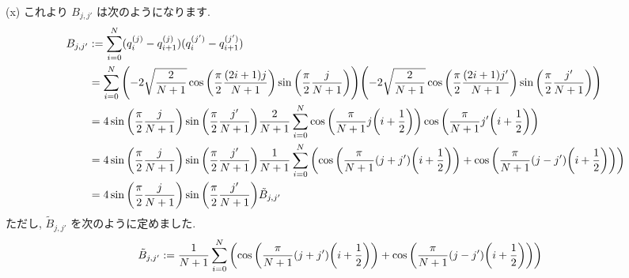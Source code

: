 \documentclass[a4paper,dvipdfmx]{jsarticle}
\theoremstyle{definition}
\begin{document}
(x) これより $B_{j,j'}$ は次のようになります.
\begin{align}
  B_{j,j'} & := \sum_{i=0}^{N}(q_i^{(j)} - q_{i+1}^{(j)})(q_i^{(j')} - q_{i+1}^{(j')})                                                                                                                                                              \\
           & = \sum_{i=0}^{N}\qty(-2\sqrt{\frac{2}{N+1}}\cos\qty(\frac{\pi}{2}\frac{(2i+1)j}{N+1})\sin\qty(\frac{\pi}{2}\frac{j}{N+1}))\qty(-2\sqrt{\frac{2}{N+1}}\cos\qty(\frac{\pi}{2}\frac{(2i+1)j'}{N+1})\sin\qty(\frac{\pi}{2}\frac{j'}{N+1})) \\
           & = 4\sin\qty(\frac{\pi}{2}\frac{j}{N+1})\sin\qty(\frac{\pi}{2}\frac{j'}{N+1})\frac{2}{N+1}\sum_{i=0}^{N}\cos\qty(\frac{\pi}{N+1}j\qty(i + \frac{1}{2}))\cos\qty(\frac{\pi}{N+1}j'\qty(i + \frac{1}{2}))                                 \\
           & = 4\sin\qty(\frac{\pi}{2}\frac{j}{N+1})\sin\qty(\frac{\pi}{2}\frac{j'}{N+1})\frac{1}{N+1}\sum_{i=0}^{N}\qty(\cos\qty(\frac{\pi}{N+1}(j + j')\qty(i + \frac{1}{2})) + \cos\qty(\frac{\pi}{N+1}(j - j')\qty(i + \frac{1}{2})))           \\
           & = 4\sin\qty(\frac{\pi}{2}\frac{j}{N+1})\sin\qty(\frac{\pi}{2}\frac{j'}{N+1})\tilde{B}_{j,j'}
\end{align}
ただし, $\tilde{B}_{j,j'}$ を次のように定めました.
\begin{align}
  \tilde{B}_{j,j'} & := \frac{1}{N+1}\sum_{i=0}^{N}\qty(\cos\qty(\frac{\pi}{N+1}(j + j')\qty(i + \frac{1}{2})) + \cos\qty(\frac{\pi}{N+1}(j - j')\qty(i + \frac{1}{2})))
\end{align}
\end{document}

